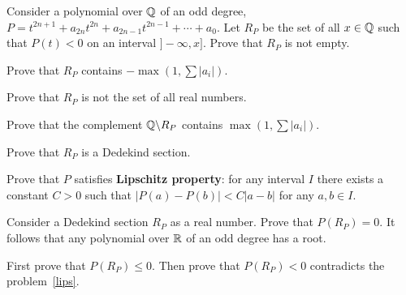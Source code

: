 \documentclass[12pt]{article}
\begin{document}




\begin{zadacha}[!] Consider a polynomial over ${\mathbb Q}$ of an odd degree,
$P= t^{2n+1} + a_{2n} t^{2n} + a_{2n-1} t^{2n-1} + \cdots + a_0$.  Let
$R_P$ be the set of all $x\in {\mathbb Q}$ such that $P(t)<0$ on an interval 
$]-\infty, x]$. Prove that $R_P$ is not empty.
\end{zadacha}

\begin{ukazanie} Prove that $R_P$ contains
$-\max(1, \sum |a_i|)$.
\end{ukazanie}

\begin{zadacha}[!] 
Prove that $R_P$ is not the set of all real numbers.
\end{zadacha}

\begin{ukazanie} Prove that the complement ${\mathbb Q} \backslash R_P$ 
contains $\max(1, \sum |a_i|)$.
\end{ukazanie}

\begin{zadacha}[!] Prove that $R_P$ is a Dedekind section. 
\end{zadacha}

\begin{zadacha}[!]\label{lips} 
  Prove that $P$ satisfies {\bf Lipschitz property}: for any interval
  $I$ there exists a constant $C > 0$ such that $|P(a)-P(b)| < C|a-b|$
  for any $a,b \in I$.
\end{zadacha}

\begin{zadacha}[!] Consider a Dedekind section
$R_P$ as a real number. Prove that $P(R_P)=0$. It follows that any
polynomial over ${\mathbb R}$ of an odd degree has a root.
\end{zadacha}

\begin{ukazanie}
First prove that $P(R_P) \leq 0$. Then prove that $P(R_P) <
0$ contradicts the problem~\ref{lips}.
\end{ukazanie}

\end{document}
